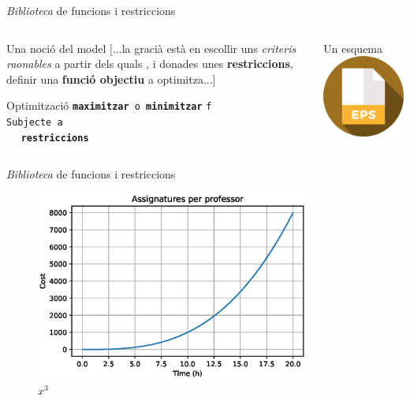 \documentclass[twocolumn]{beamer}
\begin{document}
\begin{frame}{\textit{Biblioteca} de funcions i restriccions}
\begin{columns}[t]
	\begin{column}{.5\textwidth}
		\begin{block}{Una noció del model}
			[...la gracià està en escollir uns \emph{criteris raonables}
			a partir dels quals , i donades unes \textbf{restriccions}, definir una \textbf{funció objectiu} a optimitza...]
		\end{block}
		
		\begin{block}{Optimització}
			\texttt{\textbf{maximitzar} o \textbf{minimitzar}} \texttt{f}
			\\ 
			\texttt{Subjecte a}
			\\
			$\quad $ \texttt{\textbf{restriccions}}
		\end{block}
	\end{column}
	\begin{column}{.5\textwidth}
		\begin{block}{Un esquema}
			\includegraphics[width=5cm]{eps}
		\end{block}
	\end{column}
\end{columns}
\end{frame}



\begin{frame}{\textit{Biblioteca} de funcions i restriccions}
\begin{figure}
	\includegraphics[width=9cm]{Assignatures}
	\caption{$x^3$}
\end{figure}
\end{frame}
\end{document}
